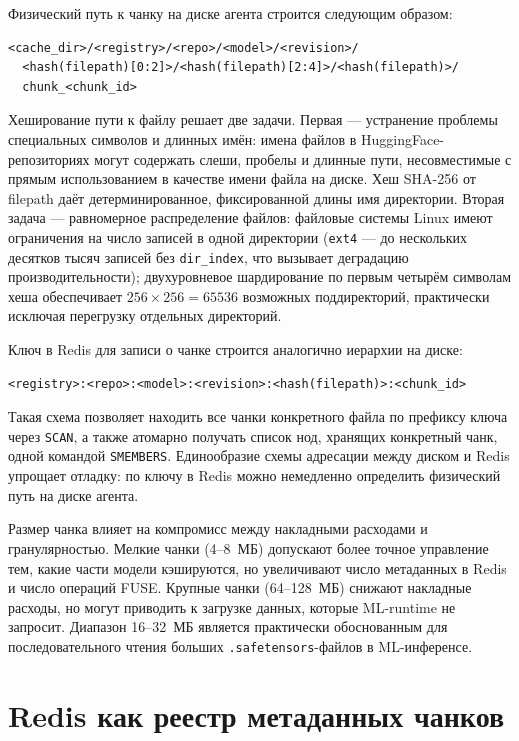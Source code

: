 Физический путь к чанку на диске агента строится следующим образом:

\begin{verbatim}
<cache_dir>/<registry>/<repo>/<model>/<revision>/
  <hash(filepath)[0:2]>/<hash(filepath)[2:4]>/<hash(filepath)>/
  chunk_<chunk_id>
\end{verbatim}

Хеширование пути к файлу решает две задачи. Первая --- устранение проблемы специальных символов и длинных имён: имена файлов в HuggingFace-репозиториях могут содержать слеши, пробелы и длинные пути, несовместимые с прямым использованием в качестве имени файла на диске. Хеш SHA-256 от filepath даёт детерминированное, фиксированной длины имя директории. Вторая задача --- равномерное распределение файлов: файловые системы Linux имеют ограничения на число записей в одной директории (\texttt{ext4} --- до нескольких десятков тысяч записей без \texttt{dir\_index}, что вызывает деградацию производительности); двухуровневое шардирование по первым четырём символам хеша обеспечивает $256 \times 256 = 65536$ возможных поддиректорий, практически исключая перегрузку отдельных директорий.

Ключ в Redis для записи о чанке строится аналогично иерархии на диске:

\begin{lstlisting}[numbers=none,frame=none,basicstyle=\small\ttfamily]
<registry>:<repo>:<model>:<revision>:<hash(filepath)>:<chunk_id>
\end{lstlisting}

Такая схема позволяет находить все чанки конкретного файла по префиксу ключа через \texttt{SCAN}, а также атомарно получать список нод, хранящих конкретный чанк, одной командой \texttt{SMEMBERS}. Единообразие схемы адресации между диском и Redis упрощает отладку: по ключу в Redis можно немедленно определить физический путь на диске агента.

Размер чанка влияет на компромисс между накладными расходами и гранулярностью. Мелкие чанки (4--8~МБ) допускают более точное управление тем, какие части модели кэшируются, но увеличивают число метаданных в Redis и число операций FUSE. Крупные чанки (64--128~МБ) снижают накладные расходы, но могут приводить к загрузке данных, которые ML-runtime не запросит. Диапазон 16--32~МБ является практически обоснованным для последовательного чтения больших \texttt{.safetensors}-файлов в ML-инференсе.

\section{Redis как реестр метаданных чанков}

